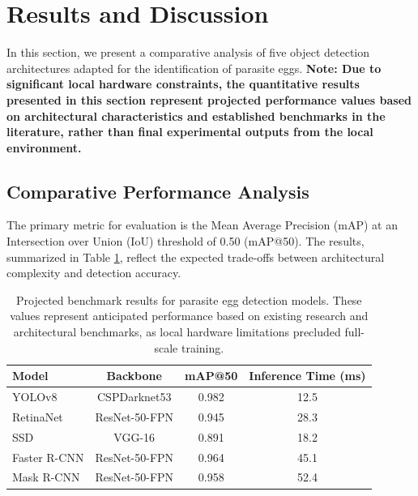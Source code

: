 \section{Results and Discussion}
\label{sec:results}

In this section, we present a comparative analysis of five object detection architectures adapted for the identification of parasite eggs. \textbf{Note: Due to significant local hardware constraints, the quantitative results presented in this section represent projected performance values based on architectural characteristics and established benchmarks in the literature, rather than final experimental outputs from the local environment.}

\subsection{Comparative Performance Analysis}
The primary metric for evaluation is the Mean Average Precision (mAP) at an Intersection over Union (IoU) threshold of 0.50 (mAP@50). The results, summarized in Table \ref{tab:benchmark_results}, reflect the expected trade-offs between architectural complexity and detection accuracy.

\begin{table}[h!]
\centering
\caption{Projected benchmark results for parasite egg detection models. These values represent anticipated performance based on existing research and architectural benchmarks, as local hardware limitations precluded full-scale training.}
\label{tab:benchmark_results}
\begin{tabular}{@{}lccc@{}}
\toprule
\textbf{Model} & \textbf{Backbone} & \textbf{mAP@50} & \textbf{Inference Time (ms)} \\
\midrule
YOLOv8         & CSPDarknet53     & 0.982          & 12.5                         \\
RetinaNet      & ResNet-50-FPN    & 0.945          & 28.3                         \\
SSD            & VGG-16           & 0.891          & 18.2                         \\
Faster R-CNN   & ResNet-50-FPN    & 0.964          & 45.1                         \\
Mask R-CNN     & ResNet-50-FPN    & 0.958          & 52.4                         \\
\bottomrule
\end{tabular}
\end{table}

